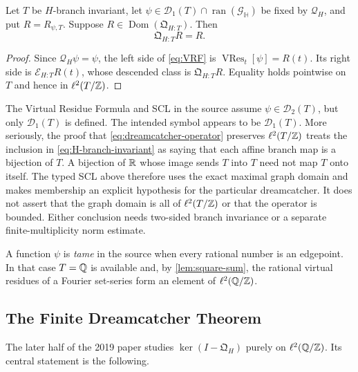 \begin{theorem}
\label{thm:SCL}
Let $T$ be $H$-branch invariant, let
$\psi\in\mathcal D_1(T)\cap\operatorname{ran}(\mathcal G_{\mathbb H})$ be
fixed by $\mathscr Q_H$, and put $R=R_{\psi,T}$.  Suppose
$R\in\operatorname{Dom}(\mathfrak Q_{H:T})$.  Then
\begin{equation}
\label{eq:SCL}
 \mathfrak Q_{H:T}R=R.
\end{equation}
\end{theorem}

\begin{proof}
Since $\mathscr Q_H\psi=\psi$, the left side of
\cref{eq:VRF} is $\operatorname{VRes}_t[\psi]=R(t)$.  Its right side is
$\mathcal E_{H:T}R(t)$, whose descended class is
$\mathfrak Q_{H:T}R$.  Equality holds pointwise on $T$ and hence in
$\ell^2(T/\mathbb Z)$.
\end{proof}

\begin{sourceissue}
The Virtual Residue Formula and SCL in the source assume
$\psi\in\mathcal D_2(T)$, but only $\mathcal D_1(T)$ is defined.  The intended
symbol appears to be $\mathcal D_1(T)$.  More seriously, the proof that
\cref{eq:dreamcatcher-operator} preserves $\ell^2(T/\mathbb Z)$ treats the inclusion
in \cref{eq:H-branch-invariant} as saying that each affine branch map is a
bijection of $T$.  A bijection of $\mathbb R$ whose image sends $T$ into $T$ need
not map $T$ onto itself.  The typed SCL above therefore uses the exact
maximal graph domain and makes membership an explicit hypothesis for the
particular dreamcatcher.  It does not assert that the graph domain is all of
$\ell^2(T/\mathbb Z)$ or that the operator is bounded.  Either conclusion needs
two-sided branch invariance or a separate finite-multiplicity norm estimate.
\end{sourceissue}

A function $\psi$ is \emph{tame} in the source when every rational number is
an edgepoint.  In that case $T=\mathbb Q$ is available and, by
\cref{lem:square-sum}, the rational virtual residues of a Fourier set-series
form an element of $\ell^2(\mathbb Q/\mathbb Z)$.

\subsection{The Finite Dreamcatcher Theorem}

The later half of the 2019 paper studies
$\ker(I-\mathfrak Q_H)$ purely on $\ell^2(\mathbb Q/\mathbb Z)$.  Its central statement is
the following.

